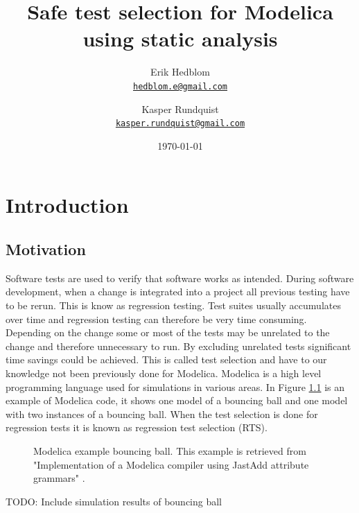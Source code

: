 \documentclass{cslthse-msc}
\author{
	Erik Hedblom \\
	{\normalsize \href{mailto:hedblom.e@gmail.com}{\texttt{hedblom.e@gmail.com}}}
	\and
	Kasper Rundquist \\
	{\normalsize \href{mailto:kasper.rundquist@gmail.com}{\texttt{kasper.rundquist@gmail.com}}}
}
\title{Safe test selection for Modelica using static analysis}
\date{\today}
\begin{document}
\makefrontmatter
\chapter[Introduction]{Introduction}


\section{Motivation}
Software tests are used to verify that software works as intended.
During software development, when a change is integrated into a project all previous testing have to be rerun. \cite{DBLP:conf/sigsoft/LegunsenHSLZM16, haider2016safe} This is know as regression testing. Test suites usually accumulates over time and regression testing can therefore be very time consuming. Depending on the change some or most of the tests may be unrelated to the change and therefore unnecessary to run. By excluding unrelated tests significant time savings could be achieved. This is called test selection and have to our knowledge not been previously done for Modelica. Modelica is a high level programming language used for simulations in various areas. In Figure \ref{fig:bouncingBallCode} is an example of Modelica code, it shows one model of a bouncing ball and one model with two instances of a bouncing ball. When the test selection is done for regression tests it is known as regression test selection (RTS). 

\begin{figure}[!htbp]
    \centering
    {}
    \caption{Modelica example bouncing ball. This example is retrieved from "Implementation of a Modelica compiler using JastAdd attribute grammars" \cite{aakesson2010implementation}.}
    \label{fig:bouncingBallCode}
\end{figure}

TODO: Include simulation results of bouncing ball
\end{document}
